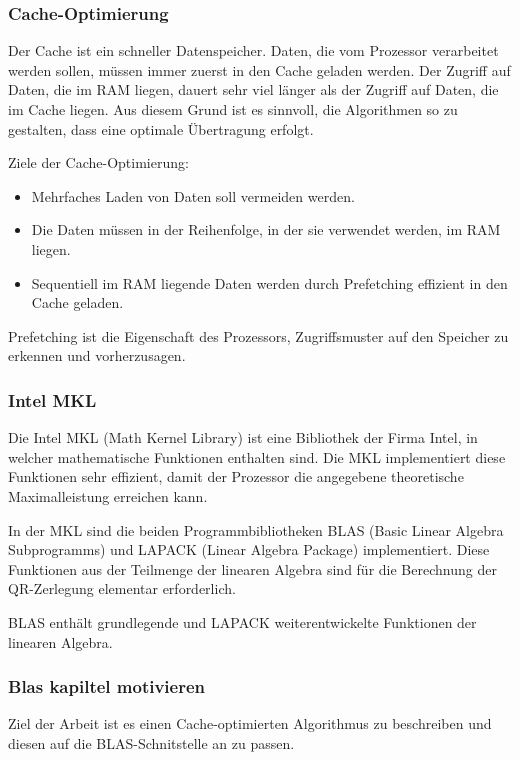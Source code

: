 \subsubsection{Cache-Optimierung}
Der Cache ist ein schneller Datenspeicher. Daten, die vom Prozessor verarbeitet werden sollen, müssen immer zuerst in den Cache geladen werden.
Der Zugriff auf Daten, die im RAM liegen, dauert sehr viel länger als der Zugriff auf Daten, die im Cache liegen.
Aus diesem Grund ist es sinnvoll, die Algorithmen so zu gestalten, dass eine optimale Übertragung erfolgt.

Ziele der Cache-Optimierung:
\begin{itemize}
	\item Mehrfaches Laden von Daten soll vermeiden werden.
	\item Die Daten müssen in der Reihenfolge, in der sie verwendet werden, im RAM liegen.
	\item Sequentiell im RAM liegende Daten werden durch Prefetching effizient in den Cache geladen.
\end{itemize}

Prefetching ist die Eigenschaft des Prozessors, Zugriffsmuster auf den Speicher zu erkennen und vorherzusagen.	

\subsubsection{Intel MKL}
Die Intel MKL (Math Kernel Library) \cite{mkl} ist eine Bibliothek der Firma Intel, in welcher mathematische Funktionen enthalten sind.
Die MKL implementiert diese Funktionen sehr effizient, damit der Prozessor die angegebene theoretische Maximalleistung erreichen kann.



In der MKL sind die beiden Programmbibliotheken BLAS (Basic Linear Algebra Subprogramms) und LAPACK (Linear Algebra Package) implementiert. 
Diese Funktionen aus der Teilmenge der linearen Algebra sind für die Berechnung der QR-Zerlegung elementar erforderlich.

BLAS enthält grundlegende und LAPACK weiterentwickelte Funktionen der linearen Algebra.

\subsubsection{Blas kapiltel motivieren}

Ziel der Arbeit ist es einen Cache-optimierten Algorithmus zu beschreiben und diesen auf die BLAS-Schnitstelle an zu passen.









